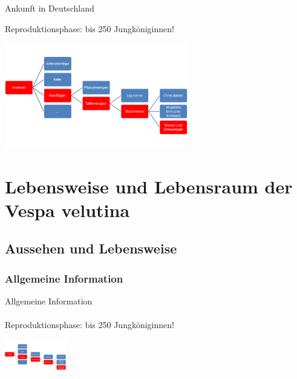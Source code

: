 \documentclass[aspectratio=169]{beamer}
\begin{document}
\begin{frame}{Ankunft in Deutschland}

	\begin{examples}{Reproduktionsphase:  }{bis 250 Jungköniginnen!}
		\begin{center}	
			\includegraphics[width=0.6\textwidth]{figures/Insekten-31.png}
		\end{center}
		\end{examples}
\end{frame}

\section{Lebensweise und Lebensraum der Vespa velutina}

\subsection{Aussehen und Lebensweise}


\subsubsection[Allgemeine Information]{Allgemeine Information}

\begin{frame}{Allgemeine Information}
	\framesubtitle{} 

\begin{examples}{Reproduktionsphase:  }{bis 250 Jungköniginnen!}
		\begin{center}	
			\includegraphics[width=0.2\textwidth]{figures/Insekten-31.png}
		\end{center}
		\end{examples}

	\end{frame}
\end{document}

